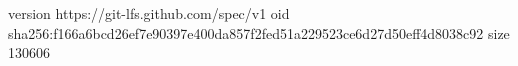 version https://git-lfs.github.com/spec/v1
oid sha256:f166a6bcd26ef7e90397e400da857f2fed51a229523ce6d27d50eff4d8038c92
size 130606
